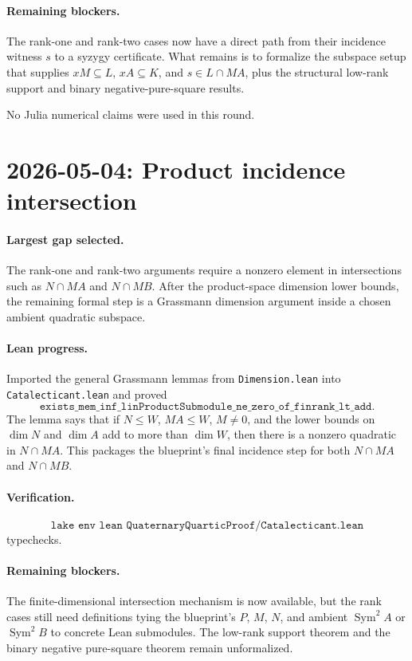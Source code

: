 \documentclass[11pt]{article}
\begin{document}
\paragraph{Remaining blockers.}
The rank-one and rank-two cases now have a direct path from their incidence
witness \(s\) to a syzygy certificate.  What remains is to formalize the
subspace setup that supplies \(xM\subseteq L\), \(xA\subseteq K\), and
\(s\in L\cap MA\), plus the structural low-rank support and binary
negative-pure-square results.

No Julia numerical claims were used in this round.

\section*{2026-05-04: Product incidence intersection}

\paragraph{Largest gap selected.}
The rank-one and rank-two arguments require a nonzero element in intersections
such as \(N\cap MA\) and \(N\cap MB\).  After the product-space dimension
lower bounds, the remaining formal step is a Grassmann dimension argument
inside a chosen ambient quadratic subspace.

\paragraph{Lean progress.}
Imported the general Grassmann lemmas from \texttt{Dimension.lean} into
\texttt{Catalecticant.lean} and proved
\[
\texttt{exists\_mem\_inf\_linProductSubmodule\_ne\_zero\_of\_finrank\_lt\_add}.
\]
The lemma says that if \(N\le W\), \(MA\le W\), \(M\neq0\), and the lower
bounds on \(\dim N\) and \(\dim A\) add to more than \(\dim W\), then there is
a nonzero quadratic in \(N\cap MA\).  This packages the blueprint's final
incidence step for both \(N\cap MA\) and \(N\cap MB\).

\paragraph{Verification.}
\[
\texttt{lake env lean QuaternaryQuarticProof/Catalecticant.lean}
\]
typechecks.

\paragraph{Remaining blockers.}
The finite-dimensional intersection mechanism is now available, but the rank
cases still need definitions tying the blueprint's \(P\), \(M\), \(N\), and
ambient \(\operatorname{Sym}^2A\) or \(\operatorname{Sym}^2B\) to concrete
Lean submodules.  The low-rank support theorem and the binary negative
pure-square theorem remain unformalized.
\end{document}
